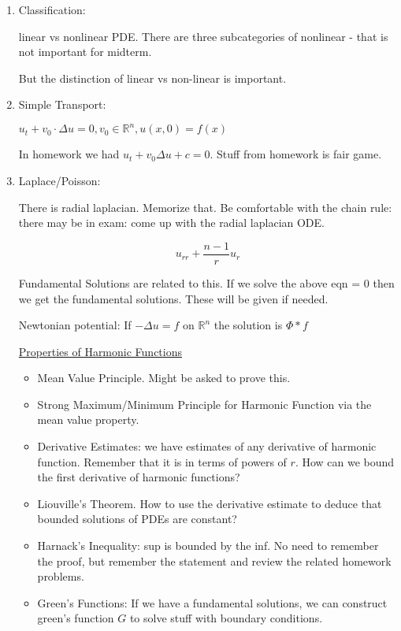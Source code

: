 \documentclass{article}
\theoremstyle{definition}
\begin{document}
\begin{enumerate}

\item Classification:

    linear vs nonlinear PDE. There are three subcategories of nonlinear - that is not important for midterm.

    But the distinction of linear vs non-linear is important.
\item Simple Transport:

    \(u_t + v_0\cdot \Delta u = 0, v_0\in\mathbb{R} ^n, u(x,0)=f(x)\)

    In homework we had \(u_t + v_0\Delta u+c=0\). Stuff from homework is fair game.

\item Laplace/Poisson:

    There is radial laplacian. Memorize that. Be comfortable with the chain rule: there may be in exam: come up with the radial laplacian ODE.

    \[
        u_{r r} + \frac{n-1}{r}u_r
    \]

    Fundamental Solutions are related to this. If we solve the above eqn = 0 then we get the fundamental solutions. These will be given if needed.

    Newtonian potential: If \(-\Delta u = f\) on \(\mathbb{R}^n\) the solution is \(\Phi \ast f\) 

    \underline{Properties of Harmonic Functions}

    \begin{itemize}
        \item Mean Value Principle. Might be asked to prove this.
        \item Strong Maximum/Minimum Principle for Harmonic Function via the mean value property.
        \item Derivative Estimates: we have estimates of any derivative of harmonic function. Remember that it is in terms of powers of \(r\). How can we bound the first derivative of harmonic functions?
        \item Liouville's Theorem. How to use the derivative estimate to deduce that bounded solutions of PDEs are constant?
        \item Harnack's Inequality: sup is bounded by the inf. No need to remember the proof, but remember the statement and review the related homework problems.
        \item Green's Functions: If we have a fundamental solutions, we can construct green's function \(G\) to solve stuff with boundary conditions.
        

\end{itemize}
\end{enumerate}
\end{document}

